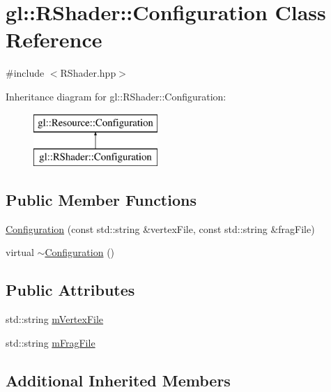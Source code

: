 \hypertarget{classgl_1_1_r_shader_1_1_configuration}{\section{gl\-:\-:R\-Shader\-:\-:Configuration Class Reference}
\label{classgl_1_1_r_shader_1_1_configuration}
}


{\ttfamily \#include $<$R\-Shader.\-hpp$>$}

Inheritance diagram for gl\-:\-:R\-Shader\-:\-:Configuration\-:\begin{figure}[H]
\begin{center}
\leavevmode
\includegraphics[height=2.000000cm]{classgl_1_1_r_shader_1_1_configuration}
\end{center}
\end{figure}
\subsection*{Public Member Functions}
\begin{DoxyCompactItemize}
\item 
\hyperlink{classgl_1_1_r_shader_1_1_configuration_ac27d7f6409dbe361012d2f705f799388}{Configuration} (const std\-::string \&vertex\-File, const std\-::string \&frag\-File)
\item 
virtual \hyperlink{classgl_1_1_r_shader_1_1_configuration_ae0a972948a97133027fff1c679f13bb3}{$\sim$\-Configuration} ()
\end{DoxyCompactItemize}
\subsection*{Public Attributes}
\begin{DoxyCompactItemize}
\item 
std\-::string \hyperlink{classgl_1_1_r_shader_1_1_configuration_aa9f93b7f474bb49fd0b94db1f77338d4}{m\-Vertex\-File}
\item 
std\-::string \hyperlink{classgl_1_1_r_shader_1_1_configuration_aa59e52a59b0a293d951c6ab1af16189a}{m\-Frag\-File}
\end{DoxyCompactItemize}
\subsection*{Additional Inherited Members}


